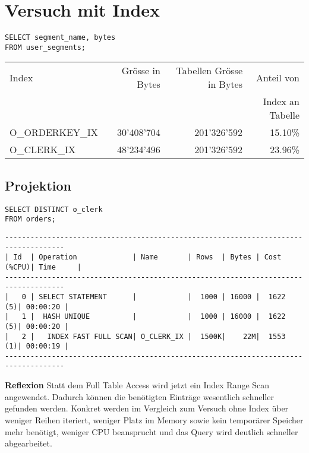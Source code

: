 \documentclass[10pt]{article}
\begin{document}
\section{Versuch mit Index}
\begin{lstlisting}[style=sql]
SELECT segment_name, bytes
FROM user_segments;
\end{lstlisting}


\begin{tabular}{l||r|r|r}
  Index & Grösse in Bytes & Tabellen Grösse in Bytes & Anteil von \\ 
  & & &  Index an Tabelle \\ \hline
  \hline
  O\_ORDERKEY\_IX & 30'408'704 & 201'326'592 & 15.10\%  \\ \hline
  O\_CLERK\_IX & 48'234'496 & 201'326'592 & 23.96\% \\ 
\end{tabular}

\subsection{Projektion}
\begin{lstlisting}[style=sql]
SELECT DISTINCT o_clerk
FROM orders;
\end{lstlisting}
\begin{lstlisting}[style=queryexecutionplan]
------------------------------------------------------------------------------------
| Id  | Operation             | Name       | Rows  | Bytes | Cost (%CPU)| Time     |
------------------------------------------------------------------------------------
|   0 | SELECT STATEMENT      |            |  1000 | 16000 |  1622   (5)| 00:00:20 |
|   1 |  HASH UNIQUE          |            |  1000 | 16000 |  1622   (5)| 00:00:20 |
|   2 |   INDEX FAST FULL SCAN| O_CLERK_IX |  1500K|    22M|  1553   (1)| 00:00:19 |
------------------------------------------------------------------------------------
\end{lstlisting}
\textbf{Reflexion} \newline
Statt dem Full Table Access wird jetzt ein Index Range Scan angewendet. Dadurch können die benötigten Einträge wesentlich schneller gefunden werden. Konkret werden im Vergleich zum Versuch ohne Index über weniger Reihen iteriert, weniger Platz im Memory sowie kein temporärer Speicher mehr benötigt, weniger CPU beansprucht und das Query wird deutlich schneller abgearbeitet.
\end{document}
